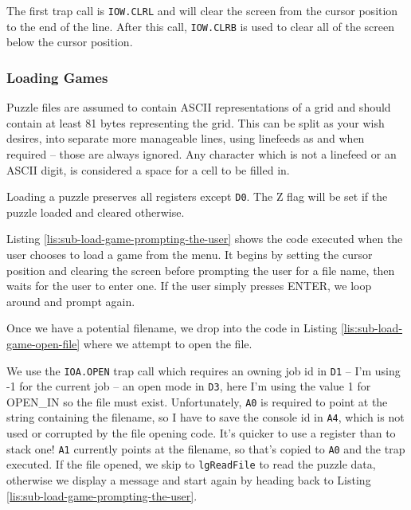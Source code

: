 

The first trap call is \texttt{IOW.CLRL} and will clear the screen
from the cursor position to the end of the line. After this call,
\texttt{IOW.CLRB} is used to clear all of the screen below the cursor
position.

\subsubsection{Loading Games}

Puzzle files are assumed to contain ASCII representations of a grid
and should contain at least 81 bytes representing the grid. This can
be split as your wish desires, into separate more manageable lines,
using linefeeds as and when required -- those are always ignored.
Any character which is not a linefeed or an ASCII digit, is considered
a space for a cell to be filled in.

Loading a puzzle preserves all registers except \texttt{D0}. The Z
flag will be set if the puzzle loaded and cleared otherwise.

Listing \ref{lis:sub-load-game-prompting-the-user} shows the code
executed when the user chooses to load a game from the menu. It begins
by setting the cursor position and clearing the screen before prompting
the user for a file name, then waits for the user to enter one. If
the user simply presses ENTER, we loop around and prompt again.



Once we have a potential filename, we drop into the code in Listing
\ref{lis:sub-load-game-open-file} where we attempt to open the file. 



We use the \texttt{IOA.OPEN} trap call which requires an owning job
id in \texttt{D1} -- I'm using -1 for the current job -- an open
mode in \texttt{D3}, here I'm using the value 1 for OPEN\_IN so the
file must exist. Unfortunately, \texttt{A0} is required to point at
the string containing the filename, so I have to save the console
id in \texttt{A4}, which is not used or corrupted by the file opening
code. It's quicker to use a register than to stack one! \texttt{A1}
currently points at the filename, so that's copied to \texttt{A0}
and the trap executed. If the file opened, we skip to \texttt{lgReadFile}
to read the puzzle data, otherwise we display a message and start
again by heading back to Listing \ref{lis:sub-load-game-prompting-the-user}.

